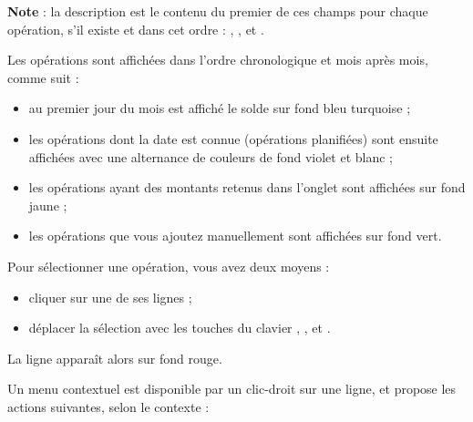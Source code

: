 \textbf{Note} : la description  est le contenu du premier de ces champs pour chaque opération, s'il existe et dans cet ordre : , ,  et .
 

Les opérations sont affichées dans l'ordre chronologique et mois après mois, comme suit :

\begin{itemize}
	 \item au premier jour du mois est affiché le solde sur fond bleu turquoise{\couleur} ;
	 \item les opérations dont la date est connue (opérations planifiées) sont ensuite affichées avec une alternance de couleurs de fond violet et blanc{\couleurs} ;
	 \item les opérations ayant des montants retenus dans l'onglet  sont affichées sur fond  jaune{\couleur} ;
	 \item les opérations que vous ajoutez manuellement sont affichées sur fond vert{\couleur}.
\end{itemize}

Pour sélectionner une opération, vous avez deux moyens :
\begin{itemize}
	 \item cliquer sur une de ses lignes ;
	 \item déplacer la sélection avec les touches du clavier , ,  et .
\end{itemize}
La ligne apparaît alors sur fond rouge{\couleur}.

Un menu contextuel est disponible par un clic-droit sur une ligne, et propose les actions suivantes, selon le contexte :

